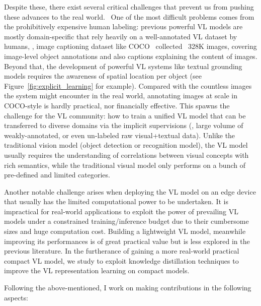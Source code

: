 Despite these, there exist several critical challenges that prevent us from pushing these advances to the real world.  One of the most difficult problems comes from the prohibitively expensive human labeling: previous powerful VL models are mostly domain-specific that rely heavily on a well-annotated VL dataset by humans, \eg, image captioning dataset like COCO~\citep{lin2014microsoft} collected  328K images, covering image-level object annotations and also captions explaining the content of images. Beyond that, the development of powerful VL systems like textual grounding models requires the awareness of spatial location per object (see Figure~\ref{fig:explicit_learning} for example). Compared with the countless images the system might encounter in the real world, annotating images at scale in COCO-style is hardly practical, nor financially effective. This spawns the challenge for the VL community: how to train a unified VL model that can be transferred to diverse domains via the implicit supervisions (\ie, large volume of weakly-annotated, or even un-labeled raw visual+textual data). Unlike the traditional vision model (object detection or recognition model), the VL model usually requires the understanding of correlations between visual concepts with rich semantics, while the traditional visual model only performs on a bunch of pre-defined and limited categories.


Another notable challenge arises when deploying the VL model on an edge device that usually has the limited computational power to be undertaken. It is impractical for real-world applications to exploit the power of prevailing VL models under a constrained training/inference budget due to their cumbersome sizes and huge computation cost. Building a lightweight VL model, meanwhile improving its performances is of great practical value but is less explored in the previous literature. In the furtherance of gaining a more real-world practical compact VL model, we study to exploit knowledge distillation techniques to improve the VL representation learning on compact models. 


Following the above-mentioned, I work on making contributions in the following aspects:

